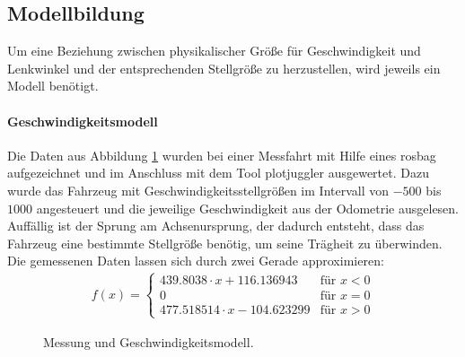 \subsection{Modellbildung}
\label{subsec:02modellbildung}
Um eine Beziehung zwischen physikalischer Gr\"o\ss{}e f\"ur Geschwindigkeit und Lenkwinkel und der entsprechenden Stellgr\"o\ss{}e zu herzustellen, wird jeweils ein Modell ben\"otigt.
\paragraph{Geschwindigkeitsmodell} 
Die Daten aus Abbildung \ref{fig:Geschwindigkeitsmodell} wurden bei einer Messfahrt mit Hilfe eines rosbag aufgezeichnet und im Anschluss mit dem Tool plotjuggler ausgewertet. Dazu wurde das Fahrzeug mit Geschwindigkeitsstellgr\"o\ss{}en im Intervall von $-500$ bis $1000$ angesteuert und die jeweilige Geschwindigkeit aus der Odometrie ausgelesen. Auff\"allig ist der Sprung am Achsenursprung, der dadurch entsteht, dass das Fahrzeug eine bestimmte Stellgr\"o\ss{}e ben\"otig, um seine Tr\"agheit zu \"uberwinden.
Die gemessenen Daten lassen sich durch zwei Gerade approximieren:
\begin{align*}
  f(x) =
  \begin{cases}
  439.8038\cdot x+116.136943 & \text{f\"ur } x < 0 \\
  0 & \text{f\"ur } x=0\\
  477.518514\cdot x-104.623299 & \text{f\"ur } x > 0 
  \end{cases}
\end{align*}

\begin{figure}[h]
	\centering
	\caption{Messung und Geschwindigkeitsmodell.}
	\label{fig:Geschwindigkeitsmodell}
\end{figure}

